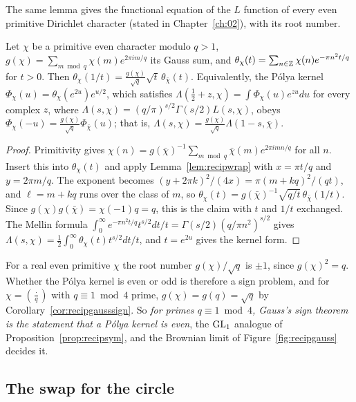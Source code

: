The same lemma gives the functional equation of the $L$ function of every even primitive Dirichlet character (stated in Chapter~\ref{ch:02}), with its root number.

\begin{theorem}\label{thm:recipdirichlet}
Let $\chi$ be a primitive even character modulo $q>1$, $g(\chi)=\sum_{m\bmod q}\chi(m)e^{2\pi im/q}$ its Gauss sum, and $\theta_\chi(t)=\sum_{n\in\mathbb{Z}}\chi(n)e^{-\pi n^2t/q}$ for $t>0$. Then $\theta_\chi(1/t)=\frac{g(\chi)}{\sqrt q}\sqrt t\,\theta_{\bar\chi}(t)$. Equivalently, the P\'olya kernel $\Phi_\chi(u)=\theta_\chi(e^{2u})e^{u/2}$, which satisfies $\Lambda(\frac12+z,\chi)=\int\Phi_\chi(u)e^{zu}du$ for every complex $z$, where $\Lambda(s,\chi)=(q/\pi)^{s/2}\Gamma(s/2)L(s,\chi)$, obeys $\Phi_\chi(-u)=\frac{g(\chi)}{\sqrt q}\Phi_{\bar\chi}(u)$; that is, $\Lambda(s,\chi)=\frac{g(\chi)}{\sqrt q}\Lambda(1-s,\bar\chi)$.
\end{theorem}

\begin{proof}
Primitivity gives $\chi(n)=g(\bar\chi)^{-1}\sum_{m\bmod q}\bar\chi(m)e^{2\pi imn/q}$ for all $n$. Insert this into $\theta_\chi(t)$ and apply Lemma~\ref{lem:recipwrap} with $x=\pi t/q$ and $y=2\pi m/q$. The exponent becomes $(y+2\pi k)^2/(4x)=\pi(m+kq)^2/(qt)$, and $\ell=m+kq$ runs over the class of $m$, so $\theta_\chi(t)=g(\bar\chi)^{-1}\sqrt{q/t}\,\theta_{\bar\chi}(1/t)$. Since $g(\chi)g(\bar\chi)=\chi(-1)q=q$, this is the claim with $t$ and $1/t$ exchanged. The Mellin formula $\int_0^\infty e^{-\pi n^2t/q}t^{s/2}dt/t=\Gamma(s/2)(q/\pi n^2)^{s/2}$ gives $\Lambda(s,\chi)=\frac12\int_0^\infty\theta_\chi(t)t^{s/2}dt/t$, and $t=e^{2u}$ gives the kernel form.
\end{proof}

For a real even primitive $\chi$ the root number $g(\chi)/\sqrt q$ is $\pm1$, since $g(\chi)^2=q$. Whether the P\'olya kernel is even or odd is therefore a sign problem, and for $\chi=(\frac\cdot q)$ with $q\equiv1\bmod4$ prime, $g(\chi)=g(q)=\sqrt q$ by Corollary~\ref{cor:recipgausssign}. So \emph{for primes $q\equiv1\bmod4$, Gauss's sign theorem is the statement that a P\'olya kernel is even}, the $\mathrm{GL}_1$ analogue of Proposition~\ref{prop:recipsym}, and the Brownian limit of Figure~\ref{fig:recipgauss} decides it.

\subsection{The swap for the circle}

